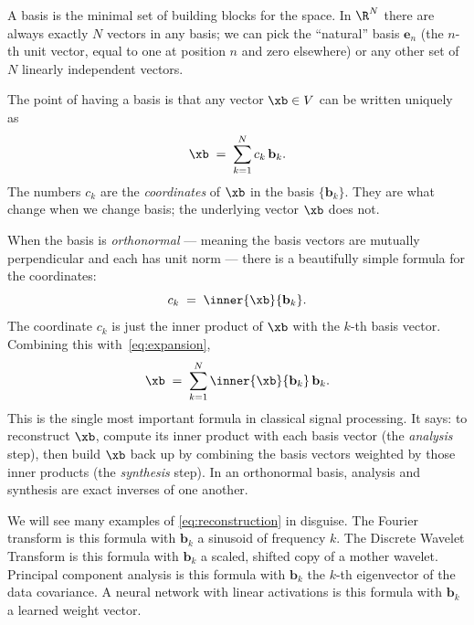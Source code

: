 A basis is the minimal set of building blocks for the space.  In $\R^N$
there are always exactly $N$ vectors in any basis; we can pick the
``natural'' basis $\mathbf{e}_n$ (the $n$-th unit vector, equal to one
at position $n$ and zero elsewhere) or any other set of $N$ linearly
independent vectors.

The point of having a basis is that any vector $\xb \in V$ can be
written uniquely as
\begin{equation}
    \xb \;=\; \sum_{k=1}^{N} c_k\, \mathbf{b}_k.
    \label{eq:expansion}
\end{equation}
The numbers $c_k$ are the \emph{coordinates} of $\xb$ in the basis
$\{\mathbf{b}_k\}$.  They are what change when we change basis; the
underlying vector $\xb$ does not.

When the basis is \emph{orthonormal} --- meaning the basis vectors are
mutually perpendicular and each has unit norm --- there is a beautifully
simple formula for the coordinates:
\begin{equation}
    c_k \;=\; \inner{\xb}{\mathbf{b}_k}.
    \label{eq:coord_orth}
\end{equation}
The coordinate $c_k$ is just the inner product of $\xb$ with the $k$-th
basis vector.  Combining this with~\eqref{eq:expansion},
\begin{equation}
    \xb \;=\; \sum_{k=1}^{N} \inner{\xb}{\mathbf{b}_k}\, \mathbf{b}_k.
    \label{eq:reconstruction}
\end{equation}
This is the single most important formula in classical signal processing.
It says: to reconstruct $\xb$, compute its inner product with each basis
vector (the \emph{analysis} step), then build $\xb$ back up by combining
the basis vectors weighted by those inner products (the \emph{synthesis}
step).  In an orthonormal basis, analysis and synthesis are exact
inverses of one another.


We will see many examples of \eqref{eq:reconstruction} in disguise.
The Fourier transform is this formula with $\mathbf{b}_k$ a sinusoid of
frequency $k$.  The Discrete Wavelet Transform is this formula with
$\mathbf{b}_k$ a scaled, shifted copy of a mother wavelet.  Principal
component analysis is this formula with $\mathbf{b}_k$ the $k$-th
eigenvector of the data covariance.  A neural network with linear
activations is this formula with $\mathbf{b}_k$ a learned weight vector.

